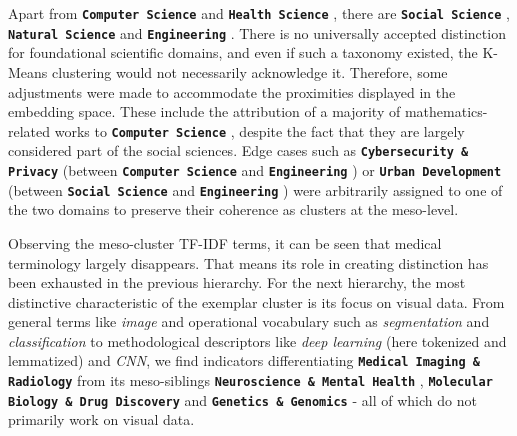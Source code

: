 \documentclass{article}
\begin{document}
	
	
	
	Apart from \textbf{\texttt{Computer Science}}  and \textbf{\texttt{Health Science}} , there are \textbf{\texttt{Social Science}} , \textbf{\texttt{Natural Science}}  and \textbf{\texttt{Engineering}} . There is no universally accepted distinction for foundational scientific domains, and even if such a taxonomy existed, the K-Means clustering would not necessarily acknowledge it. Therefore, some adjustments were made to accommodate the proximities displayed in the embedding space. These include the attribution of a majority of mathematics-related works to \textbf{\texttt{Computer Science}} , despite the fact that they are largely considered part of the social sciences. Edge cases such as \textbf{\texttt{Cybersecurity \& Privacy}}  (between \textbf{\texttt{Computer Science}}  and \textbf{\texttt{Engineering}} ) or \textbf{\texttt{Urban Development}}  (between \textbf{\texttt{Social Science}}  and \textbf{\texttt{Engineering}} ) were arbitrarily assigned to one of the two domains to preserve their coherence as clusters at the meso-level.
	
	Observing the meso-cluster TF-IDF terms, it can be seen that medical terminology largely disappears. That means its role in creating distinction has been exhausted in the previous hierarchy. For the next hierarchy, the most distinctive characteristic of the exemplar cluster is its focus on visual data. From general terms like \textit{image} and operational vocabulary such as \textit{segmentation} and \textit{classification} to methodological descriptors like \textit{deep learning} (here tokenized and lemmatized) and \textit{CNN}, we find indicators differentiating \textbf{\texttt{Medical Imaging \& Radiology}}  from its meso-siblings \textbf{\texttt{Neuroscience \& Mental Health}} , \textbf{\texttt{Molecular Biology \& Drug Discovery}}  and \textbf{\texttt{Genetics \& Genomics}}  - all of which do not primarily work on visual data.
	
\end{document}
